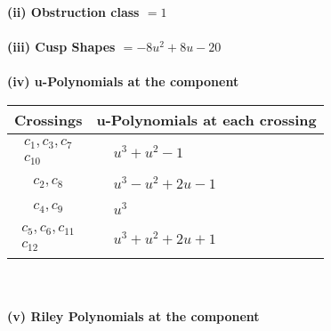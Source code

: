 \documentclass[1p]{elsarticle_modified}
\theoremstyle{definition}
\begin{document}
\flushleft \textbf{(ii) Obstruction class $= 1$}\\~\\
\flushleft \textbf{(iii) Cusp Shapes $= -8 u^2+8 u-20$}\\~\\
\newpage\renewcommand{\arraystretch}{1}
\flushleft \textbf{(iv) u-Polynomials at the component}\newline \\
\begin{tabular}{m{50pt}|m{274pt}}
Crossings & \hspace{64pt}u-Polynomials at each crossing \\
\hline $$\begin{aligned}c_{1},c_{3},c_{7}\\c_{10}\end{aligned}$$&$\begin{aligned}
&u^3+u^2-1
\end{aligned}$\\
\hline $$\begin{aligned}c_{2},c_{8}\end{aligned}$$&$\begin{aligned}
&u^3- u^2+2 u-1
\end{aligned}$\\
\hline $$\begin{aligned}c_{4},c_{9}\end{aligned}$$&$\begin{aligned}
&u^3
\end{aligned}$\\
\hline $$\begin{aligned}c_{5},c_{6},c_{11}\\c_{12}\end{aligned}$$&$\begin{aligned}
&u^3+u^2+2 u+1
\end{aligned}$\\
\hline
\end{tabular}\\~\\
\newpage\renewcommand{\arraystretch}{1}
\flushleft \textbf{(v) Riley Polynomials at the component}\newline \\
\end{document}
